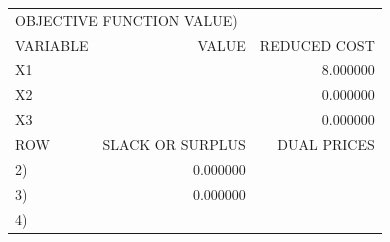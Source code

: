 \begin{problems}
        \begin{center}\footnotesize\ttfamily
        \begin{tabular}{lrr}
        \multicolumn{3}{l}{OBJECTIVE FUNCTION VALUE\quad 1)\ \underline{\hspace{3em}}}\\[3pt]
        VARIABLE & VALUE & REDUCED COST\\
        X1 & \underline{\hspace{3em}} & 8.000000\\
        X2 & \underline{\hspace{3em}} & 0.000000\\
        X3 & \underline{\hspace{3em}} & 0.000000\\[3pt]
        ROW & SLACK OR SURPLUS & DUAL PRICES\\
        2) & 0.000000 & \underline{\hspace{3em}}\\
        3) & 0.000000 & \underline{\hspace{3em}}\\
        4) & \underline{\hspace{3em}} & \underline{\hspace{3em}}\\
        \end{tabular}


\end{center}
\end{problems}
